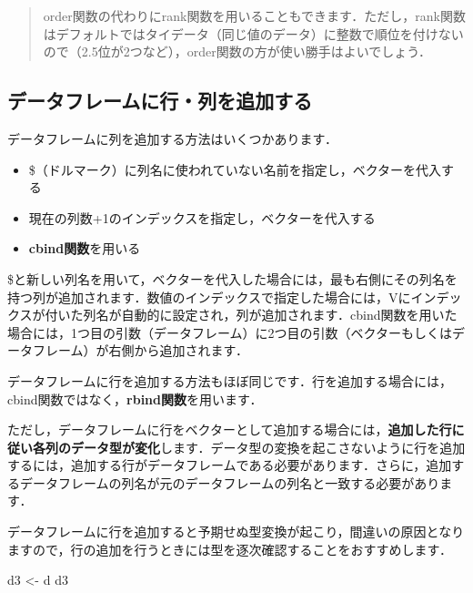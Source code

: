 \documentclass[
  letterpaper,
  DIV=11,
  numbers=noendperiod]{scrreprt}
\newenvironment{Shaded}{\begin{snugshade}}{\end{snugshade}}
\newcommand{\NormalTok}[1]{\textcolor[rgb]{0.00,0.23,0.31}{#1}}
\newcommand{\OtherTok}[1]{\textcolor[rgb]{0.00,0.23,0.31}{#1}}
\providecommand{\tightlist}{%
  \setlength{\itemsep}{0pt}\setlength{\parskip}{0pt}}\usepackage{longtable,booktabs,array}
\begin{document}
\begin{quote}
order関数の代わりにrank関数を用いることもできます．ただし，rank関数はデフォルトではタイデータ（同じ値のデータ）に整数で順位を付けないので（2.5位が2つなど），order関数の方が使い勝手はよいでしょう．
\end{quote}

\hypertarget{ux30c7ux30fcux30bfux30d5ux30ecux30fcux30e0ux306bux884cux5217ux3092ux8ffdux52a0ux3059ux308b}{%
\subsection{データフレームに行・列を追加する}\label{ux30c7ux30fcux30bfux30d5ux30ecux30fcux30e0ux306bux884cux5217ux3092ux8ffdux52a0ux3059ux308b}}

データフレームに列を追加する方法はいくつかあります．

\begin{itemize}
\tightlist
\item
  \$（ドルマーク）に列名に使われていない名前を指定し，ベクターを代入する
\item
  現在の列数+1のインデックスを指定し，ベクターを代入する
\item
  \textbf{cbind関数}を用いる
\end{itemize}

\$と新しい列名を用いて，ベクターを代入した場合には，最も右側にその列名を持つ列が追加されます．数値のインデックスで指定した場合には，Vにインデックスが付いた列名が自動的に設定され，列が追加されます．cbind関数を用いた場合には，1つ目の引数（データフレーム）に2つ目の引数（ベクターもしくはデータフレーム）が右側から追加されます．

データフレームに行を追加する方法もほぼ同じです．行を追加する場合には，cbind関数ではなく，\textbf{rbind関数}を用います．

ただし，データフレームに行をベクターとして追加する場合には，\textbf{追加した行に従い各列のデータ型が変化}します．データ型の変換を起こさないように行を追加するには，追加する行がデータフレームである必要があります．さらに，追加するデータフレームの列名が元のデータフレームの列名と一致する必要があります．

データフレームに行を追加すると予期せぬ型変換が起こり，間違いの原因となりますので，行の追加を行うときには型を逐次確認することをおすすめします．

\begin{Shaded}
\begin{Highlighting}[]
\NormalTok{d3 }\OtherTok{\textless{}{-}}\NormalTok{ d}
\NormalTok{d3}
\end{Highlighting}
\end{Shaded}
\end{document}
